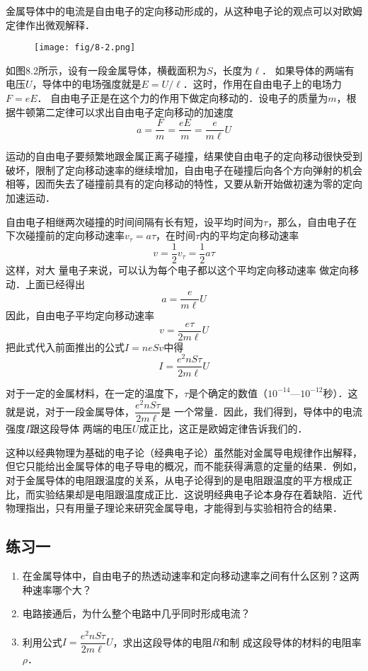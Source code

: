 金属导体中的电流是自由电子的定向移动形成的，从这种电子论的观点可以对欧姆定律作出微观解释．
\begin{figure}[htp]\centering
    \texttt{[image: fig/8-2.png]}
    \caption{}
    \end{figure}

如图8.2所示，设有一段金属导体，横截面积为$S$，长度为$\ell$． 如果导体的两端有电压$U$，导体中的电场强度就是$E=U/\ell$．这时，作用在自由电子上的电场力$F=eE$． 自由电子正是在这个力的作用下做定向移动的．设电子的质量为$m$，根
据牛顿第二定律可以求出自由电子定向移动的加速度
\[a=\frac{F}{m}=\frac{eE}{m}=\frac{e}{m\ell}U\]

运动的自由电子要频繁地跟金属正离子碰撞，结果使自由电子的定向移动很快受到破坏，限制了定向移动速率的继续增加，自由电子在碰撞后向各个方向弹射的机会相等，因而失去了碰撞前具有的定向移动的特性，又要从新开始做初速为零的定向加速运动．

自由电子相继两次碰撞的时间间隔有长有短，设平均时间为$\tau$，那么，自由电子在下次碰撞前的定向移动速率$v_{\tau}=a\tau$，在时间$\tau$内的平均定向移动速率
\[v=\frac{1}{2}v_{\tau}=\frac{1}{2}a\tau\]
这样，对大
量电子来说，可以认为每个电子都以这个平均定向移动速率
做定向移动．上面已经得出
\[a=\frac{e}{m\ell}U\]
因此，自由电子平均定向移动速率
\[v=\frac{e\tau}{2m\ell}U\]
把此式代入前面推出的公式$I=neSv$中得
\[I=\frac{e^2 nS\tau}{2m\ell}U\]

对于一定的金属材料，在一定的温度下，$\tau$是个确定的数值（$10^{-14}$—$10^{-12}$秒）．这就是说，对于一段金属导体，$\dfrac{e^2 nS\tau}{2m\ell}$是
一个常量．因此，我们得到，导体中的电流强度$I$跟这段导体
两端的电压$U$成正比，这正是欧姆定律告诉我们的．

这种以经典物理为基础的电子论（经典电子论）虽然能对金属导电规律作出解释，但它只能给出金属导体的电子导电的概况，而不能获得满意的定量的结果．例如，对于金属导体的电阻跟温度的关系，从电子论得到的是电阻跟温度的平方根成正比，而实验结果却是电阻跟温度成正比．这说明经典电子论本身存在着缺陷．近代物理指出，只有用量子理论来研究金属导电，才能得到与实验相符合的结果．

\subsection*{练习一}
\begin{enumerate}
    \item 在金属导体中，自由电子的热透动速率和定向移动逮率之间有什么区别？这两种速率哪个大？
    \item 电路接通后，为什么整个电路中几乎同时形成电流？
    \item 利用公式$I=\dfrac{e^2 nS\tau}{2m\ell}U$，求出这段导体的电阻$R$和制
成这段导体的材料的电阻率$\rho$．
\end{enumerate}


